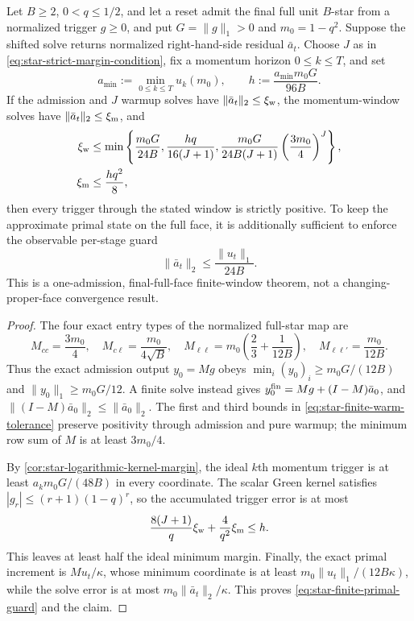 \documentclass[11pt]{article}
\begin{document}
\begin{proposition}
\label{prop:star-finite-inner-window}
Let $B\geq2$, $0<q\leq1/2$, and let a reset admit the final full unit $B$-star from a normalized trigger
$g\geq0$, and put $G=\lVert g\rVert_1>0$ and $m_0=1-q^2$.  Suppose the
shifted solve returns normalized right-hand-side residual $\bar a_t$.
Choose $J$ as in \eqref{eq:star-strict-margin-condition}, fix a momentum
horizon $0\leq k\leq T$, and set
\begin{equation*}
 a_{\min}:=\min_{0\leq k\leq T}u_k(m_0),
 \qquad
 h:=\frac{a_{\min}m_0G}{96B}.
\end{equation*}
If the admission and $J$ warmup solves have
$\lVert\bar a_t\rVert_2\leq\xi_{\rm w}$, the momentum-window solves have
$\lVert\bar a_t\rVert_2\leq\xi_{\rm m}$, and
\begin{align}
 \xi_{\rm w}&\leq
 \min\left\{
  \frac{m_0G}{24B},
  \frac{hq}{16(J+1)},
  \frac{m_0G}{24B(J+1)}\left(\frac{3m_0}{4}\right)^J
 \right\},
 \label{eq:star-finite-warm-tolerance}\\
 \xi_{\rm m}&\leq\frac{hq^2}{8},
 \label{eq:star-finite-momentum-tolerance}
\end{align}
then every trigger through the stated window is strictly positive.  To keep
the approximate primal state on the full face, it is additionally sufficient
to enforce the observable per-stage guard
\begin{equation}
 \lVert\bar a_t\rVert_2\leq\frac{\lVert u_t\rVert_1}{24B}.
 \label{eq:star-finite-primal-guard}
\end{equation}
This is a one-admission, final-full-face finite-window theorem, not a
changing-proper-face convergence result.
\end{proposition}

\begin{proof}
The four exact entry types of the normalized full-star map are
\[
 M_{cc}=\frac{3m_0}{4},\quad
 M_{c\ell}=\frac{m_0}{4\sqrt B},\quad
 M_{\ell\ell}=m_0\left(\frac23+\frac{1}{12B}\right),\quad
 M_{\ell\ell'}=\frac{m_0}{12B}.
\]
Thus the exact admission output $y_0=Mg$ obeys
$\min_i(y_0)_i\geq m_0G/(12B)$ and
$\lVert y_0\rVert_1\geq m_0G/12$.  A finite solve instead gives
$y_0^{\rm fin}=Mg+(I-M)\bar a_0$, and
$\lVert(I-M)\bar a_0\rVert_2\leq\lVert\bar a_0\rVert_2$.  The first and
third bounds in \eqref{eq:star-finite-warm-tolerance} preserve positivity
through admission and pure warmup; the minimum row sum of $M$ is at least
$3m_0/4$.

By \cref{cor:star-logarithmic-kernel-margin}, the ideal $k$th momentum
trigger is at least $a_km_0G/(48B)$ in every coordinate.  The scalar Green
kernel satisfies $|g_r|\leq(r+1)(1-q)^r$, so the accumulated trigger error is
at most
\[
 \frac{8(J+1)}q\xi_{\rm w}+\frac4{q^2}\xi_{\rm m}\leq h.
\]
This leaves at least half the ideal minimum margin.  Finally, the exact primal
increment is $M u_t/\kappa$, whose minimum coordinate is at least
$m_0\lVert u_t\rVert_1/(12B\kappa)$, while the solve error is at most
$m_0\lVert\bar a_t\rVert_2/\kappa$.  This proves
\eqref{eq:star-finite-primal-guard} and the claim.
\end{proof}
\end{document}
